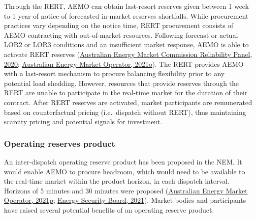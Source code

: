 \documentclass[12pt,a4paper,]{report}
\begin{document}
Through the RERT, AEMO can obtain last-resort reserves given between 1
week to 1 year of notice of forecasted in-market reserves shortfalls.
While procurement practices vary depending on the notice time, RERT
procurement consists of AEMO contracting with out-of-market resources.
Following forecast or actual LOR2 or LOR3 conditions and an insufficient
market response, AEMO is able to activate RERT reserves
(\protect\hyperlink{ref-australianenergymarketcommissionreliabilitypanelReliabilityEmergencyReserve2020}{Australian
Energy Market Commission Reliability Panel, 2020};
\protect\hyperlink{ref-australianenergymarketoperatorProcedureExerciseReliability2021}{Australian
Energy Market Operator, 2021o}). The RERT provides AEMO with a
last-resort mechanism to procure balancing flexibility prior to any
potential load shedding. However, resources that provide reserves
through the RERT are unable to participate in the real-time market for
the duration of their contract. After RERT reserves are activated,
market participants are remunerated based on counterfactual pricing
(i.e.~dispatch without RERT), thus maintaining scarcity pricing and
potential signals for investment.

\hypertarget{sec:reserves-orcontext}{%
\subsubsection{Operating reserves
product}\label{sec:reserves-orcontext}}

An inter-dispatch operating reserve product has been proposed in the
NEM. It would enable AEMO to procure headroom, which would need to be
available to the real-time market within the product horizon, in each
dispatch interval. Horizons of 5 minutes and 30 minutes were proposed
(\protect\hyperlink{ref-australianenergymarketoperatorSubmissionAEMCDirections2021}{Australian
Energy Market Operator, 2021p};
\protect\hyperlink{ref-energysecurityboardPost2025Market2021}{Energy
Security Board, 2021}). Market bodies and participants have raised
several potential benefits of an operating reserve product:
\end{document}
